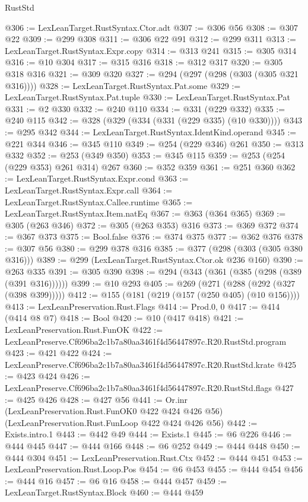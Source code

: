 \begin{lexlean}{RustStd}
\begin{coremodule}
@306 := LexLeanTarget.RustSyntax.Ctor.adt
@307 := @306 @56
@308 := @307 @22
@309 := @299 @308
@311 := @306 @22 @91
@312 := @299 @311
@313 := LexLeanTarget.RustSyntax.Expr.copy
@314 := @313 @241
@315 := @305 @314
@316 := @10 @304
@317 := @315 @316
@318 := @312 @317
@320 := @305 @318 @316
@321 := @309 @320
@327 := @294 (@297 (@298 (@303 (@305 @321 @316))))
@328 := LexLeanTarget.RustSyntax.Pat.some
@329 := LexLeanTarget.RustSyntax.Pat.tuple
@330 := LexLeanTarget.RustSyntax.Pat
@331 := @2 @330
@332 := @240 @110
@334 := @331 (@229 @332)
@335 := @240 @115
@342 := @328 (@329 (@334 (@331 (@229 @335) (@10 @330))))
@343 := @295 @342
@344 := LexLeanTarget.RustSyntax.IdentKind.operand
@345 := @221 @344
@346 := @345 @110
@349 := @254 (@229 @346) @261
@350 := @313 @332
@352 := @253 (@349 @350)
@353 := @345 @115
@359 := @253 (@254 (@229 @353) @261 @314) @267
@360 := @352 @359
@361 := @251 @360
@362 := LexLeanTarget.RustSyntax.Expr.cond
@363 := LexLeanTarget.RustSyntax.Expr.call
@364 := LexLeanTarget.RustSyntax.Callee.runtime
@365 := LexLeanTarget.RustSyntax.Item.natEq
@367 := @363 (@364 @365)
@369 := @305 (@263 @346)
@372 := @305 (@263 @353) @316
@373 := @369 @372
@374 := @367 @373
@375 := Bool.false
@376 := @374 @375
@377 := @362 @376
@378 := @307 @56
@380 := @299 @378 @316
@385 := @377 (@298 (@303 (@305 @380 @316)))
@389 := @299 (LexLeanTarget.RustSyntax.Ctor.ok @236 @160)
@390 := @263 @335
@391 := @305 @390
@398 := @294 (@343 (@361 (@385 (@298 (@389 (@391 @316))))))
@399 := @10 @293
@405 := @269 (@271 (@288 (@292 (@327 (@398 @399)))))
@412 := @155 (@181 (@219 (@157 (@250 @405) (@10 @156))))
@413 := LexLeanPreservation.Rust.Flags
@414 := Prod.{0, 0}
@417 := @414 (@414 @8 @7)
@418 := Bool
@420 := @10 (@417 @418)
@421 := LexLeanPreservation.Rust.FunOK
@422 := LexLeanPreserve.Cf696ba2c1b7a80aa3461f4d56447897c.R20.RustStd.program
@423 := @421 @422
@424 := LexLeanPreserve.Cf696ba2c1b7a80aa3461f4d56447897c.R20.RustStd.krate
@425 := @423 @424
@426 := LexLeanPreserve.Cf696ba2c1b7a80aa3461f4d56447897c.R20.RustStd.flags
@427 := @425 @426
@428 := @427 @56
@441 := Or.inr
    (LexLeanPreservation.Rust.FunOK0 @422 @424 @426 @56)
    (LexLeanPreservation.Rust.FunLoop @422 @424 @426 @56)
@442 := Exists.intro.{1}
@443 := @442 @49
@444 := Exists.{1}
@445 := @6 @226
@446 := @444 @445
@447 := @444 @166
@448 := @6 @252
@449 := @444 @448
@450 := @444 @304
@451 := LexLeanPreservation.Rust.Ctx
@452 := @444 @451
@453 := LexLeanPreservation.Rust.Loop.Pos
@454 := @6 @453
@455 := @444 @454
@456 := @444 @16
@457 := @6 @16
@458 := @444 @457
@459 := LexLeanTarget.RustSyntax.Block
@460 := @444 @459

\end{coremodule}
\end{lexlean}
